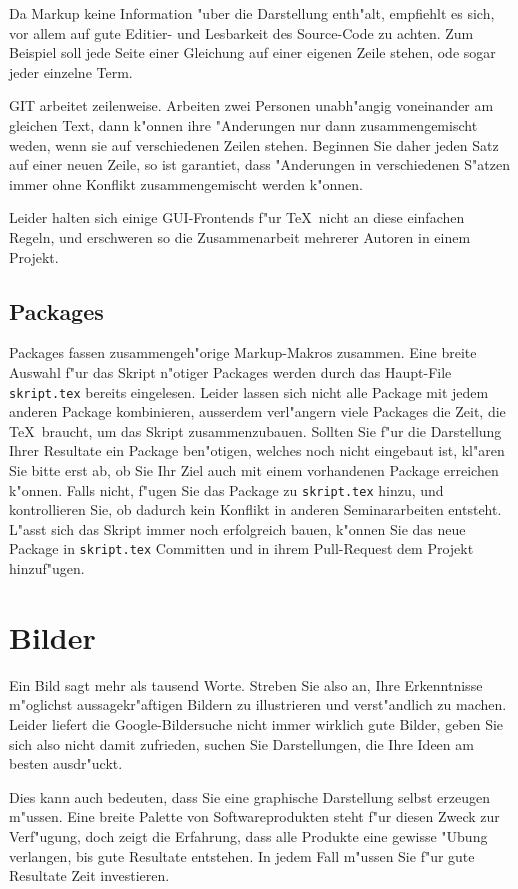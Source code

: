 \documentclass[a4paper,12pt]{article}
\begin{document}
Da Markup keine Information "uber die Darstellung enth"alt,
empfiehlt es sich, vor allem auf gute Editier- und Lesbarkeit
des Source-Code zu achten.
Zum Beispiel soll jede Seite einer Gleichung auf einer eigenen
Zeile stehen, ode sogar jeder einzelne Term.

GIT arbeitet zeilenweise.
Arbeiten zwei Personen unabh"angig voneinander am gleichen Text,
dann k"onnen ihre "Anderungen nur dann zusammengemischt weden,
wenn sie auf verschiedenen Zeilen stehen.
Beginnen Sie daher jeden Satz auf einer neuen Zeile,
so ist garantiet, dass "Anderungen in verschiedenen S"atzen
immer ohne Konflikt zusammengemischt werden k"onnen.

Leider halten sich einige GUI-Frontends f"ur \TeX\ nicht an diese 
einfachen Regeln, und erschweren so die Zusammenarbeit mehrerer
Autoren in einem Projekt.

\subsection{Packages}
Packages fassen zusammengeh"orige Markup-Makros zusammen.
Eine breite Auswahl f"ur das Skript n"otiger Packages werden durch
das Haupt-File \texttt{skript.tex} bereits eingelesen.
Leider lassen sich nicht alle Package mit jedem anderen Package
kombinieren, ausserdem verl"angern viele Packages die Zeit, die
\TeX\ braucht, um das Skript zusammenzubauen.
Sollten Sie f"ur die Darstellung Ihrer Resultate ein Package ben"otigen,
welches noch nicht eingebaut ist, kl"aren Sie bitte erst ab, ob Sie
Ihr Ziel auch mit einem vorhandenen Package erreichen k"onnen.
Falls nicht, f"ugen Sie das Package zu \texttt{skript.tex} hinzu,
und kontrollieren Sie, ob dadurch kein Konflikt in anderen Seminararbeiten
entsteht.
L"asst sich das Skript immer noch erfolgreich bauen, k"onnen Sie das
neue Package in \texttt{skript.tex} Committen und in ihrem Pull-Request
dem Projekt hinzuf"ugen.

\section{Bilder}
Ein Bild sagt mehr als tausend Worte.
Streben Sie also an, Ihre Erkenntnisse m"oglichst aussagekr"aftigen
Bildern zu illustrieren und verst"andlich zu machen.
Leider liefert die Google-Bildersuche nicht immer wirklich gute Bilder,
geben Sie sich also nicht damit zufrieden, suchen Sie Darstellungen,
die Ihre Ideen am besten ausdr"uckt.

Dies kann auch bedeuten, dass Sie eine graphische Darstellung selbst
erzeugen m"ussen.
Eine breite Palette von Softwareprodukten steht f"ur diesen Zweck
zur Verf"ugung, doch zeigt die Erfahrung, dass alle Produkte
eine gewisse "Ubung verlangen, bis gute Resultate entstehen.
In jedem Fall m"ussen Sie f"ur gute Resultate Zeit investieren.
\end{document}
